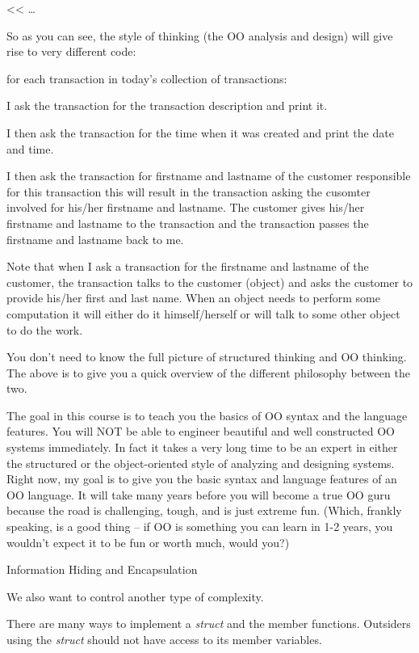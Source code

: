 \documentclass[
]{article}
\begin{document}
\textless\textless{} \ldots{}

So as you can see, the style of thinking (the OO analysis and design)
will give rise to very different code:

for each transaction in today's collection of transactions:

I ask the transaction for the transaction description and print it.

I then ask the transaction for the time when it was created and print
the date and time.

I then ask the transaction for firstname and lastname of the customer
responsible for this transaction this will result in the transaction
asking the cusomter involved for his/her firstname and lastname. The
customer gives his/her firstname and lastname to the transaction and the
transaction passes the firstname and lastname back to me.

Note that when I ask a transaction for the firstname and lastname of the
customer, the transaction talks to the customer (object) and asks the
customer to provide his/her first and last name. When an object needs to
perform some computation it will either do it himself/herself or will
talk to some other object to do the work.

You don't need to know the full picture of structured thinking and OO
thinking. The above is to give you a quick overview of the different
philosophy between the two.

The goal in this course is to teach you the basics of OO syntax and the
language features. You will NOT be able to engineer beautiful and well
constructed OO systems immediately. In fact it takes a very long time to
be an expert in either the structured or the object-oriented style of
analyzing and designing systems. Right now, my goal is to give you the
basic syntax and language features of an OO language. It will take many
years before you will become a true OO guru because the road is
challenging, tough, and is just extreme fun. (Which, frankly speaking,
is a good thing -- if OO is something you can learn in 1-2 years, you
wouldn't expect it to be fun or worth much, would you?)

Information Hiding and Encapsulation

We also want to control another type of complexity.

There are many ways to implement a \emph{struct} and the member
functions. Outsiders using the \emph{struct} should not have access to
its member variables.
\end{document}
